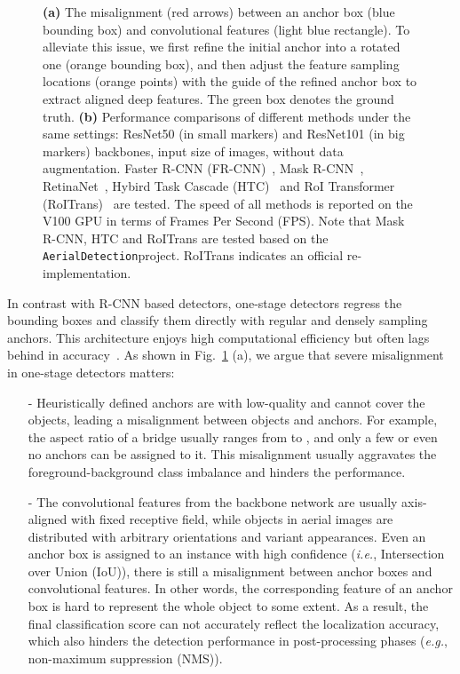 \documentclass[10pt,journal,final]{IEEEtran}
\def\eg{{\em e.g.}}
\def\ie{{\em i.e.}}
\begin{document}
\begin{figure}[htp!]
  \centering
    \vspace{-2mm}
    \caption{{\bf (a)} {The misalignment (red arrows) between an anchor box (blue bounding box) and convolutional features (light blue rectangle)}. To alleviate this issue, we first refine the initial anchor into a rotated one (orange bounding box), and then adjust the feature sampling locations (orange points) with the guide of the refined anchor box to extract aligned deep features. The green box denotes the ground truth. {\bf (b)} Performance comparisons of different methods under the same settings: ResNet50 (in small markers) and ResNet101 (in 
   big markers) backbones,  input size of images, without data augmentation. Faster R-CNN (FR-CNN)~\cite{ren2017faster}, Mask R-CNN~\cite{he2017maskrcnn}, RetinaNet~\cite{lin2017focal}, Hybird Task Cascade (HTC)~\cite{chen2019htc} and RoI Transformer (RoITrans)~\cite{ding2018transformer} are tested. The speed of all methods is reported on the V100 GPU in terms of Frames Per Second (FPS). Note that Mask R-CNN, HTC and RoITrans are tested based on the \texttt{AerialDetection}\protect\footnotemark[1] project. RoITrans indicates an official re-implementation.}
    \label{fig:alignment_fig}
   \vspace{-4mm}
  \end{figure}
  
In contrast with R-CNN based detectors, one-stage detectors regress the bounding boxes and classify them directly with regular and densely sampling anchors. This architecture enjoys high computational efficiency but often lags behind in accuracy~\cite{xia2018dota}. As shown in Fig.~\ref{fig:alignment_fig} (a), we argue that severe misalignment in one-stage detectors matters: 
\begin{itemize}
\item  [-]Heuristically defined anchors are with low-quality and cannot cover the objects, leading a misalignment between objects and anchors. For example, the aspect ratio of a bridge usually ranges from  to , and only a few or even no anchors can be assigned to it. This misalignment usually aggravates the foreground-background class imbalance and hinders the performance.
\item [-]The convolutional features from the backbone network are usually axis-aligned with fixed receptive field, while objects in aerial images are distributed with arbitrary orientations and variant appearances. Even an anchor box is assigned to an instance with high confidence (\ie, Intersection over Union (IoU)), there is still a misalignment between anchor boxes and convolutional features. In other words, the corresponding feature of an anchor box is hard to represent the whole object to some extent. As a result, the final classification score can not accurately reflect the localization accuracy, which also hinders the detection performance in post-processing phases (\eg, non-maximum suppression (NMS)).
\end{itemize} 
\end{document}
